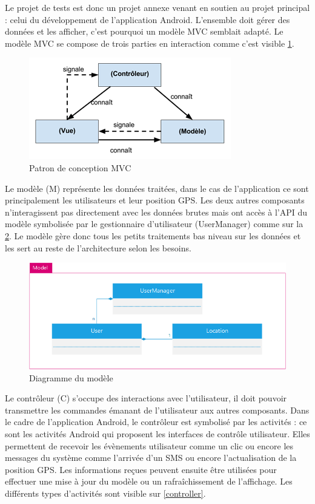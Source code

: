 Le projet de tests est donc un projet annexe venant en soutien au projet principal : celui du développement de l’application Android. L’ensemble doit gérer des données et les afficher, c’est pourquoi un modèle MVC semblait adapté. Le modèle MVC se compose de trois parties en interaction comme c’est visible \ref{mvc}.

\begin{figure}
    \centering
    \includegraphics{./img/mvc.png}
    \caption{Patron de conception MVC}
    \label{mvc}
\end{figure}

Le modèle (M) représente les données traitées, dans le cas de l’application ce sont principalement les utilisateurs et leur position GPS. Les deux autres composants n’interagissent pas directement avec les données brutes mais ont accès à l’API du modèle symbolisée par le gestionnaire d’utilisateur (UserManager) comme sur la \ref{model}. Le modèle gère donc tous les petits traitements bas niveau sur les données et les sert au reste de l’architecture selon les besoins.

\begin{figure}
    \centering
    \includegraphics{./img/android-model.png}
    \caption{Diagramme du modèle}
    \label{model}
\end{figure}

Le contrôleur (C) s’occupe des interactions avec l’utilisateur, il doit pouvoir transmettre les commandes émanant de l’utilisateur aux autres composants. Dans le cadre de l’application Android, le contrôleur est symbolisé par les activités : ce sont les activités Android qui proposent les interfaces de contrôle utilisateur. Elles permettent de recevoir les évènements utilisateur comme un clic ou encore les messages du système comme l’arrivée d’un SMS ou encore l’actualisation de la position GPS. Les informations reçues peuvent ensuite être utilisées pour effectuer une mise à jour du modèle ou un rafraîchissement de l’affichage. Les différents types d’activités sont visible sur \ref{controller}.

